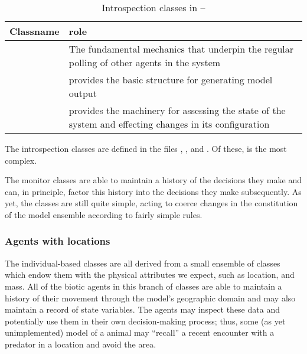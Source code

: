 \begin{table}[H]
\begin{center}
  \caption{Introspection classes in \ReModel -- \label{classtableII}}
  \begin{tabular}{l L{7cm}}
    \toprule
    \textbf{Classname} & \textbf{role} \\
    \midrule
     & The fundamental mechanics that
      underpin the regular polling of other agents in the system\\
     & {provides the basic structure for generating model output}\\
     & {provides the machinery for assessing the state
      of the system and effecting changes in its configuration}\\
    \bottomrule
  \end{tabular}
\end{center}
\end{table}
The introspection classes are defined in the files
, , and
.  Of these,  is the
most complex.

The monitor classes are able to maintain a history of the decisions
they make and can, in principle, factor this history into the
decisions they make subsequently.  As yet, the \mmonitor classes are
still quite simple, acting to coerce changes in the constitution of
the model ensemble according to fairly simple rules.

\goodbreak
\subsubsection{Agents with locations}

The individual-based classes are all derived from a small ensemble of
classes which endow them with the physical attributes we expect, such
as location, and mass. All of the biotic agents in this branch of
classes are able to maintain a history of their movement through the
model's geographic domain and may also maintain a record of state
variables. The agents may inspect these data and potentially use them
in their own decision-making process; thus, some (as yet
unimplemented) model of a animal may ``recall'' a recent encounter
with a predator in a location and avoid the area.

